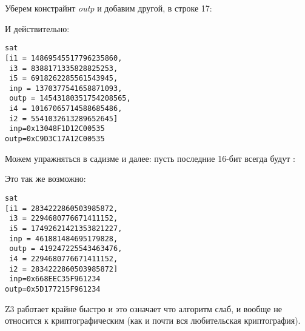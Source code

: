 Уберем констрайнт \textit{outp} и добавим другой, в строке 17:



И действительно:

\begin{lstlisting}
sat
[i1 = 14869545517796235860,
 i3 = 8388171335828825253,
 i5 = 6918262285561543945,
 inp = 1370377541658871093,
 outp = 14543180351754208565,
 i4 = 10167065714588685486,
 i2 = 5541032613289652645]
 inp=0x13048F1D12C00535
outp=0xC9D3C17A12C00535
\end{lstlisting}

Можем упражняться в садизме и далее: пусть последние 16-бит всегда будут :



Это так же возможно:

\begin{lstlisting}
sat
[i1 = 2834222860503985872,
 i3 = 2294680776671411152,
 i5 = 17492621421353821227,
 inp = 461881484695179828,
 outp = 419247225543463476,
 i4 = 2294680776671411152,
 i2 = 2834222860503985872]
 inp=0x668EEC35F961234
outp=0x5D177215F961234
\end{lstlisting}

Z3 работает крайне быстро и это означает что алгоритм слаб, и вообще не относится к криптографическим 
(как и почти вся любительская криптография).

